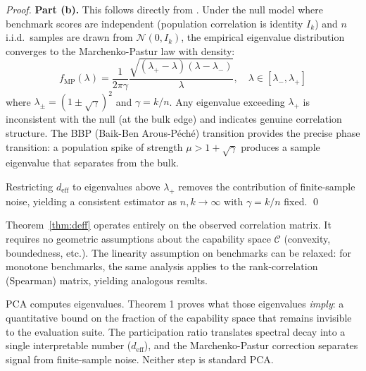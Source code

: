 \begin{proof}
\textbf{Part (b).} This follows directly from \citet{marchenko1967distribution}. Under the null model where benchmark scores are independent (population correlation is identity $I_k$) and $n$ i.i.d.\ samples are drawn from $\mathcal{N}(0, I_k)$, the empirical eigenvalue distribution converges to the Marchenko-Pastur law with density:
\[
  f_{\mathrm{MP}}(\lambda) = \frac{1}{2\pi\gamma} \frac{\sqrt{(\lambda_+ - \lambda)(\lambda - \lambda_-)}}{\lambda}, \quad \lambda \in [\lambda_-, \lambda_+]
\]
where $\lambda_\pm = (1 \pm \sqrt{\gamma})^2$ and $\gamma = k/n$. Any eigenvalue exceeding $\lambda_+$ is inconsistent with the null (at the bulk edge) and indicates genuine correlation structure. The BBP (Baik-Ben Arous-P\'ech\'e) transition \cite{baik2005phase} provides the precise phase transition: a population spike of strength $\mu > 1 + \sqrt{\gamma}$ produces a sample eigenvalue that separates from the bulk.

Restricting $d_{\mathrm{eff}}$ to eigenvalues above $\lambda_+$ removes the contribution of finite-sample noise, yielding a consistent estimator as $n, k \to \infty$ with $\gamma = k/n$ fixed. \qed
\end{proof}

\begin{remark}
Theorem~\ref{thm:deff} operates entirely on the observed correlation matrix. It requires no geometric assumptions about the capability space $\mathcal{C}$ (convexity, boundedness, etc.). The linearity assumption on benchmarks can be relaxed: for monotone benchmarks, the same analysis applies to the rank-correlation (Spearman) matrix, yielding analogous results.
\end{remark}

\begin{remark}
PCA computes eigenvalues. Theorem 1 proves what those eigenvalues \emph{imply}: a quantitative bound on the fraction of the capability space that remains invisible to the evaluation suite. The participation ratio translates spectral decay into a single interpretable number ($d_{\mathrm{eff}}$), and the Marchenko-Pastur correction separates signal from finite-sample noise. Neither step is standard PCA.
\end{remark}
